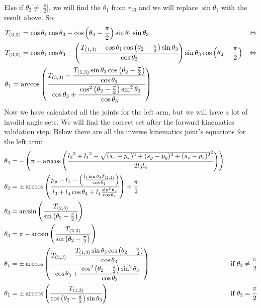Else if $\theta_2 \neq \left|\frac{\pi}{2}\right|$, we will find the $\theta_1$ from $r_{33}$ and we will replace $\sin\theta_1$ with the result above. So:
\begin{align*}
&T_{(3,3)} = \cos\theta_1\cos\theta_3 - \cos\left(\theta_2 - \frac{\pi}{2}\right)\sin\theta_1\sin\theta_3 &\Leftrightarrow \\
&T_{(3,3)} = \cos\theta_1\cos\theta_3 - \left(\cfrac{T_{(1,3)} - \cos\theta_1\cos\left(\theta_2 - \frac{\pi}{2}\right)\sin\theta_3}{\cos\theta_3}\right)\sin\theta_3\cos\left(\theta_2 - \frac{\pi}{2}\right) &\Leftrightarrow \\
&\theta_1 = \arccos\left(\cfrac{T_{(3,3)} -\cfrac{ T_{(1,3)}\sin\theta_3\cos\left(\theta_2 - \frac{\pi}{2}\right)}{\cos\theta_3}}{\cos\theta_3 + \cfrac{\cos^2\left(\theta_2-\frac{\pi}{2}\right)\sin^2\theta_3}{\cos\theta_3}}\right)
\end{align*}
Now we have calculated all the joints for the left arm, but we will have a lot of invalid angle sets. We will find the correct set after the forward kinematics validation step. Below there are all the inverse kinematics joint's equations for the left arm:
\begin{align*}
\theta_4 &= -\left(\pi - \arccos\left(\cfrac{{l_3}^2 + {l_4}^2 - \sqrt{(s_x-p_x)^2 + (s_y-p_y)^2 + (s_z-p_z)^2}^2 }{2 l_3 l_4}\right)\right)\\
\theta_2 &= \pm\arccos\left(\cfrac{p_y - l_1 - \left(\frac{l_4\sin\theta_4 T_{(2,2)}}{\cos\theta_4}\right)}{l_3 +l_4\cos\theta_4 + l_4\frac{\sin^2\theta_4}{\cos\theta_4}}\right)+\cfrac{\pi}{2}\\
\theta_3 &= \arcsin\left(\cfrac{T_{(2,3)}}{\sin\left(\theta_2-\frac{\pi}{2}\right)}\right)\\
\theta_3 &= \pi - \arcsin\left(\frac{T_{(2,3)}}{\sin\left(\theta_2-\frac{\pi}{2}\right)}\right)\\
\theta_1 &= \pm\arccos\left(\cfrac{T_{(3,3)} - \cfrac{T_{(1,3)}\sin\theta_3\cos\left(\theta_2 - \frac{\pi}{2}\right)}{\cos\theta_3}}{\cos\theta_3 + \cfrac{\cos^2\left(\theta_2-\frac{\pi}{2}\right)\sin^2\theta_3}{\cos\theta_3}}\right) &\text{if } \theta_3 \neq \cfrac{\pi}{2}\\
\theta_1 &= \pm\arccos\left(\cfrac{T_{(1,3)}}{\cos\left(\theta_2 - \frac{\pi}{2}\right)\sin\theta_3}\right) &\text{if } \theta_3 = \cfrac{\pi}{2}
\end{align*}
